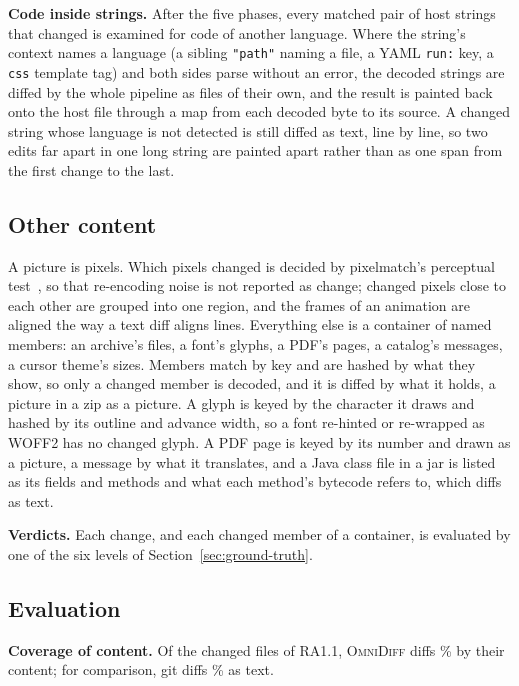 \documentclass[sigconf,review]{acmart}
\begin{document}
\textbf{Code inside strings.} After the five phases, every matched pair of host strings that
changed is examined for code of another language. Where the string's context names a language
(a sibling \texttt{"path"} naming a file, a YAML \texttt{run:} key, a \texttt{css} template tag)
and both sides parse without an error, the decoded strings are diffed by the whole pipeline as
files of their own, and the result is painted back onto the host file through a map from each
decoded byte to its source. A changed string whose language is not detected is still diffed as
text, line by line, so two edits far apart in one long string are painted apart rather than as
one span from the first change to the last.

\subsection{Other content}
\label{sec:omnidiff-content}

A picture is pixels. Which pixels changed is decided by pixelmatch's
perceptual test~\cite{pixelmatch}, so that re-encoding noise is not reported as change; changed
pixels close to each other are grouped into one region, and the frames of an animation are aligned
the way a text diff aligns lines. Everything else is a container of named members: an archive's
files, a font's glyphs, a PDF's pages, a catalog's messages, a cursor theme's sizes. Members match
by key and are hashed by what they show, so only a changed member is decoded, and it is diffed by
what it holds, a picture in a zip as a picture. A glyph is keyed by the character it draws
and hashed by its outline and advance width, so a font re-hinted or re-wrapped as WOFF2 has no
changed glyph. A PDF page is keyed by its number and drawn as a picture, a message by what it
translates, and a Java class file in a jar is listed as its fields and methods and what each
method's bytecode refers to, which diffs as text.

\textbf{Verdicts.} Each change, and each changed member of a container, is evaluated by one of
the six levels of Section~\ref{sec:ground-truth}.

\subsection{Evaluation}
\label{sec:omnidiff-evaluation}

\textbf{Coverage of content.} Of the \ContentCensusChanges{} changed files of RA1.1,
\textsc{OmniDiff} diffs \ContentCensusShownPct{}\% by their content; for comparison, git diffs
\ChangeCensusTextPct{}\% as text.
\end{document}
